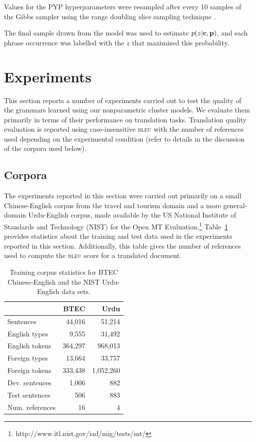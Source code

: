 Values for the PYP hyperparameters were resampled after every 10 samples of the Gibbs sampler using the range doubling slice sampling technique \citep{neal:2000,johnson:2009}.

The final sample drawn from the model was used to estimate $p(z|\textbf{c},\textbf{p})$, and each phrase occurrence was labelled with the $z$ that maximized this probability.

\section{Experiments}

This section reports a number of experiments carried out to test the quality of the grammars learned using our nonparametric cluster models.  We evaluate them primarily in terms of their performance on translation tasks.  Translation quality evaluation is reported using case-insensitive \textsc{bleu} \citep{bleu} with the number of references used depending on the experimental condition (refer to details in the discussion of the corpora used below).

\subsection{Corpora}

The experiments reported in this section were carried out primarily on a small Chinese-English corpus from the travel and tourism domain \citep{btec} and a more general-domain Urdu-English corpus, made available by the US National Institute of Standards and Technology (NIST) for the Open MT Evaluation.\footnote{http://www.itl.nist.gov/iad/mig/tests/mt/} Table~\ref{tab:corpbtecur} provides statistics about the training and test data used in the experiments reported in this section.  Additionally, this table gives the number of references used to compute the \textsc{bleu} score for a translated document.

\begin{table}[h]
\caption{Training corpus statistics for BTEC Chinese-English and the NIST Urdu-English data sets.}
\begin{center}
\begin{tabular}{l|r|r}
& BTEC & Urdu \\
\hline
Sentences & 44,016 & 51,214 \\
English types & 9,555 & 31,492 \\
English tokens & 364,297 & 968,013 \\
Foreign types & 13,664 & 33,757 \\
Foreign tokens & 333,438 & 1,052,260 \\
\hline
Dev. sentences & 1,006 & 882 \\
Test sentences & 506 & 883 \\
Num. references & 16 & 4
\end{tabular}
\end{center}
\label{tab:corpbtecur}
\end{table}%

